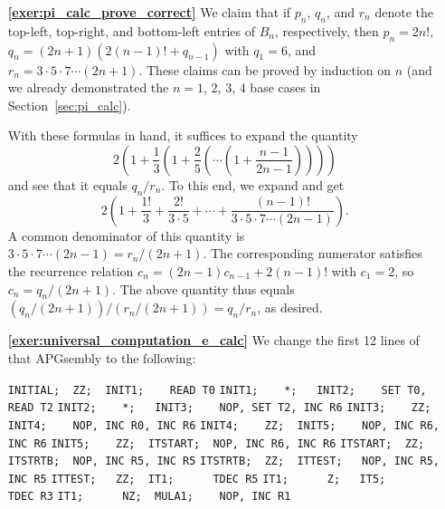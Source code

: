 \begin{multicols}{2}
\begin{itemize}[leftmargin=0em]
	
		\item[\bf\color{ocre}\sffamily\ref{exer:pi_calc_prove_correct}] We claim that if $p_n$, $q_n$, and $r_n$ denote the top-left, top-right, and bottom-left entries of $B_n$, respectively, then $p_n = 2n!$, $q_n = (2n+1)(2(n-1)! + q_{n-1})$ with $q_1 = 6$, and $r_n = 3\cdot 5 \cdot 7 \cdots (2n+1)$. These claims can be proved by induction on $n$ (and we already demonstrated the $n = 1$, $2$, $3$, $4$ base cases in Section~\ref{sec:pi_calc}).
		
		With these formulas in hand, it suffices to expand the quantity
		\[
			2\left(1 + \frac{1}{3}\left( 1 + \frac{2}{5}\left( \cdots \left( 1 + \frac{n-1}{2n-1}\right)\right)\right)\right)
		\]
		and see that it equals $q_n/r_n$. To this end, we expand and get
		\[
			2\left(1 + \frac{1!}{3} + \frac{2!}{3\cdot 5} + \cdots + \frac{(n-1)!}{3\cdot 5\cdot 7\cdots (2n-1)}\right).
		\]
		A common denominator of this quantity is $3 \cdot 5 \cdot 7 \cdots (2n-1) = r_n/(2n+1)$. The corresponding numerator satisfies the recurrence relation $c_n = (2n-1)c_{n-1} + 2(n-1)!$ with $c_1 = 2$, so $c_n = q_n/(2n+1)$. The above quantity thus equals $(q_n/(2n+1))/(r_n/(2n+1)) = q_n/r_n$, as desired.\\
	
		
		\item[\bf\color{ocre}\sffamily\ref{exer:universal_computation_e_calc}] We change the first 12 lines of that APGsembly to the following:
		\begin{center}
			\noindent\begin{minipage}{\linewidth}\scriptsize
				\noindent\verb|INITIAL;  ZZ;  INIT1;    READ T0|
				\verb|INIT1;    *;   INIT2;    SET T0, READ T2|
				\verb|INIT2;    *;   INIT3;    NOP, SET T2, INC R6|
				\verb|INIT3;    ZZ;  INIT4;    NOP, INC R0, INC R6|
				\verb|INIT4;    ZZ;  INIT5;    NOP, INC R6, INC R6|
				\verb|INIT5;    ZZ;  ITSTART;  NOP, INC R6, INC R6|
				\verb|ITSTART;  ZZ;  ITSTRTB;  NOP, INC R5, INC R5|
				\verb|ITSTRTB;  ZZ;  ITTEST;   NOP, INC R5, INC R5|
				\verb|ITTEST;   ZZ;  IT1;      TDEC R5|
				\verb|IT1;      Z;   IT5;      TDEC R3|
				\verb|IT1;      NZ;  MULA1;    NOP, INC R1|
			\end{minipage}
		\end{center}
	
	${}$\\[1cm]
	
	${}$
	\end{itemize}
\end{multicols}


